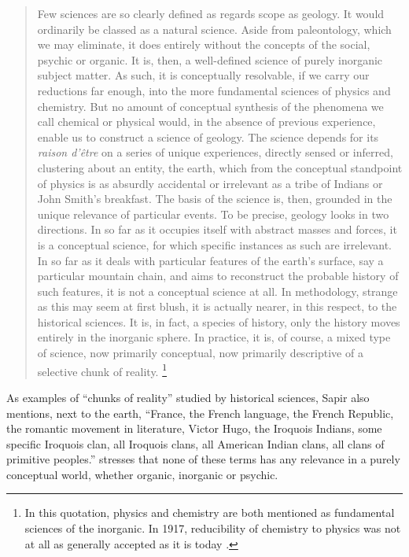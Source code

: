 \documentclass[output=paper]{langscibook}
\begin{document}
\begin{quotation}
    Few sciences are so clearly defined as regards scope as geology. It would ordinarily be classed as a natural science. Aside from paleontology, which we may eliminate, it does entirely without the concepts of the social, psychic or organic. It is, then, a well-defined science of purely inorganic subject matter. As such, it is conceptually resolvable, if we carry our reductions far enough, into the more fundamental sciences of physics and chemistry. But no amount of conceptual synthesis of the phenomena we call chemical or physical would, in the absence of previous experience, enable us to construct a science of geology. The science depends for its \emph{raison d'être} on a series of unique experiences, directly sensed or inferred, clustering about an entity, the earth, which from the conceptual standpoint of physics is as absurdly accidental or irrelevant as a tribe of Indians or John Smith's breakfast. The basis of the science is, then, grounded in the unique relevance of particular events. To be precise, geology looks in two directions. In so far as it occupies itself with abstract masses and forces, it is a conceptual science, for which specific instances as such are irrelevant. In so far as it deals with particular features of the earth's surface, say a particular mountain chain, and aims to reconstruct the probable history of such features, it is not a conceptual science at all. In methodology, strange as this may seem at first blush, it is actually nearer, in this respect, to the historical sciences. It is, in fact, a species of history, only the history moves entirely in the inorganic sphere. In practice, it is, of course, a mixed type of science, now primarily conceptual, now primarily descriptive of a selective chunk of reality.\label{q:elffers:sapirquote}
    \citep[445]{Sapir1917}\footnote{In this quotation, physics and chemistry are both mentioned as fundamental sciences of the inorganic. In 1917, reducibility of chemistry to physics was not at all as generally accepted as it is today \citep[cf.][13, 17-18]{Hettema2012}.} 
\end{quotation}

As examples of ``chunks of reality'' studied by historical sciences, Sapir also mentions, next to the earth, ``France, the French language, the French Republic, the romantic movement in literature, Victor Hugo, the Iroquois Indians, some specific Iroquois clan, all Iroquois clans, all American Indian clans, all clans of primitive peoples.'' \citet[446]{Sapir1917} stresses that none of these terms has any relevance in a purely conceptual world, whether organic, inorganic or psychic.
\end{document}
